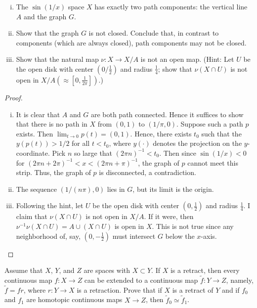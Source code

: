 \documentclass{article}
\begin{document}
\begin{enumerate}[(i)] 
\item The $\sin(1/x)$ space $X$ has exactly two path components: the vertical line $A$ 
and the graph $G$.
\item Show that the graph $G$ is not closed. Conclude that, in contrast to components
(which are always closed), path components may not be closed.
\item Show that the natural map $\nu: X \to X/A$ is not an open map. (Hint: Let $U$
be the open disk with center $(0/\frac 1 2)$ and radius $\frac 1 4$; show that $\nu(X \cap U)$
is not open in $X/A (\approx [0, \frac 1 {2 \pi}])$.)
\end{enumerate}

\begin{proof}
\begin{enumerate}[(i)] 
\item It is clear that $A$ and $G$ are both path connected. Hence it suffices to show that
there is no path in $X$ from $(0,1)$ to $(1/\pi, 0)$. Suppose such a path $p$
exists. Then $\lim_{t \to 0} p(t) = (0,1)$. Hence, there exists $t_0$ such that the $y(p(t)) > 1/2$
for all $t < t_0$, where $y(\cdot)$ denotes the projection on the $y$-coordinate. 
Pick $n$ so large that $(2\pi n)^{-1} < t_0$.  Then since $\sin(1/x) < 0$ for 
$(2\pi n + 2\pi)^{-1} < x < (2\pi n + \pi)^{-1}$, the graph of $p$ cannot meet this strip.
Thus, the graph of $p$ is disconnected, a contradiction.

\item The sequence $(1/(n\pi), 0)$ lies in $G$, but its limit is the origin.

\item Following the hint, let $U$ be the open disk with center $(0, \frac 1 2)$ and radius $\frac 1 4$. 
I claim that $\nu(X \cap U)$ is not open in $X / A$.  If it were, then $\nu^{-1} \nu(X \cap U) = A \cup (X \cap U)$ is open in $X$.
This is not true since any neighborhood of, say, $(0, - \frac 1 2)$ must intersect $G$ below the $x$-axis.
\end{enumerate}

\end{proof}



 Assume that $X$, $Y$, and $Z$ are spaces with $X \subset Y$. If $X$ is a retract, then 
every continuous map $f: X \to Z$ can be extended to a continuous map $\tilde f : Y \to Z$, 
namely, $\tilde f = fr$, where $r: Y \to X$ is a retraction. Prove that if $X$ is a retract of
$Y$ and if $f_0$ and $f_1$ are homotopic continuous maps $X \to Z$, then $\tilde f_0 \simeq \tilde f_1$.
\end{document}
